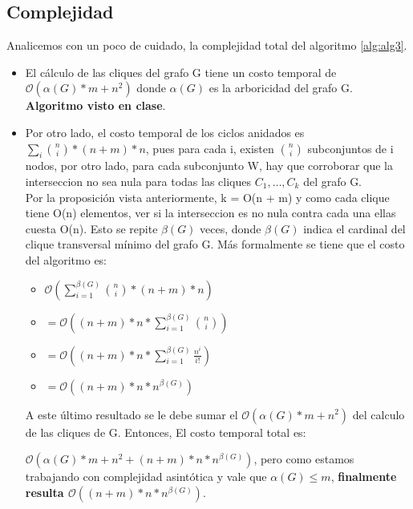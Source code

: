 \documentclass[10pt,a4paper]{article}
\begin{document}
\subsection{Complejidad}
Analicemos con un poco de cuidado, la complejidad total del algoritmo \ref{alg:alg3}.
\begin{itemize}
    \item El cálculo de las cliques del grafo G tiene un costo temporal de $\mathcal{O}(\alpha(G)*m + n^2)$ donde $\alpha(G)$ es la arboricidad del grafo G. \textbf{Algoritmo visto en clase}.
    \item Por otro lado, el costo temporal de los ciclos anidados es $\displaystyle\sum_{i} \binom{n}{i} * (n + m) * n$, pues para cada i, existen $\binom{n}{i}$ subconjuntos de i nodos, por otro lado, para cada subconjunto W, hay que corroborar que la interseccion no sea nula para todas las cliques $C_1, \dots, C_k $ del grafo G.\\
    Por la proposición vista anteriormente, k = O(n + m) y como cada clique tiene O(n) elementos, ver si la interseccion es no nula contra cada una ellas cuesta O(n). Esto se repite $\beta(G)$ veces, donde $\beta(G)$ indica el cardinal del clique transversal mínimo del grafo G. Más formalmente se tiene que el costo del algoritmo es:\\
    \begin{itemize}
        \item $\mathcal{O}(\displaystyle\sum_{i = 1}^{\beta(G)} \binom{n}{i} * (n + m) * n)$
        \item $= \mathcal{O}((n + m) * n * \displaystyle\sum_{i = 1}^{\beta(G)} \binom{n}{i})$
        \item $= \mathcal{O}((n + m) * n * \displaystyle\sum_{i = 1}^{\beta(G)} \frac{n^i}{i!})$
        \item $= \mathcal{O}((n + m) * n * n^{\beta(G)})$
    \end{itemize}
    
A este último resultado se le debe sumar el $\mathcal{O}(\alpha(G)*m + n^2)$ del calculo de las cliques de G. Entonces, El costo temporal total es:

$\mathcal{O}(\alpha(G)*m + n^2 + (n + m) * n * n^{\beta(G)})$, pero como estamos trabajando con complejidad asintótica y vale que $\alpha(G) \leq m$, \textbf{finalmente resulta $\mathcal{O}((n + m) * n * n^{\beta(G)})$}.
    
\end{itemize}
\end{document}
